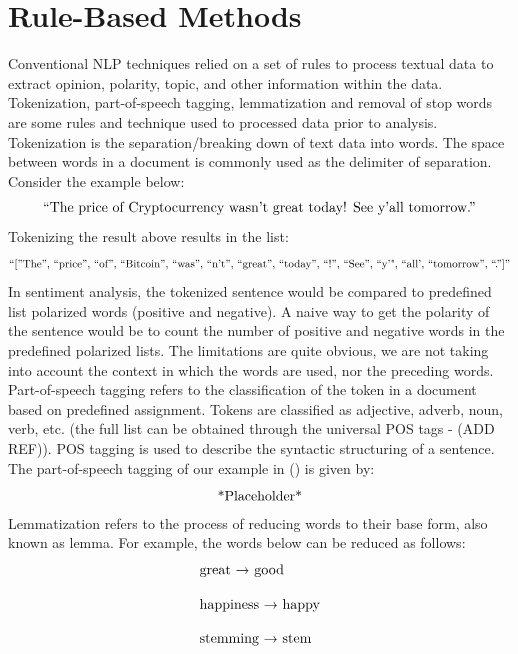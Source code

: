 \par 

\section{Rule-Based Methods}
Conventional NLP techniques relied on a set of rules to process textual data to extract opinion, polarity, topic, and other information within the data. Tokenization, part-of-speech tagging, lemmatization and removal of stop words are some rules and technique used to processed data prior to analysis. Tokenization is the separation/breaking down of text data into words. The space between words in a document is commonly used as the delimiter of separation. Consider the example below:
\begin{align*}
\intertext{“The price of Cryptocurrency wasn’t great today! See y’all tomorrow.”}    
\end{align*}
Tokenizing the result above results in the list:
\begin{align*}
    \intertext{“[”The”, “price”, “of”, “Bitcoin”, “was”,  “n’t”, “great”, “today”, “!”, “See”,  “y’", “all', “tomorrow”, “.”]”}    
\end{align*}
In sentiment analysis, the tokenized sentence would be compared to predefined list polarized words (positive and negative). A naive way to get the polarity of the sentence would be to count the number of positive and negative words in the predefined polarized lists. The limitations are quite obvious, we are not taking into account the context in which the words are used, nor the preceding words. Part-of-speech tagging refers to the classification of the token in a document based on predefined assignment. Tokens are classified as adjective,  adverb, noun, verb, etc. (the full list can be obtained through the universal POS tags - (ADD REF)). POS tagging is used to describe the syntactic structuring of a sentence. The part-of-speech tagging of our example in () is given by:
\begin{align*}
\intertext{*Placeholder*}   
\end{align*}
Lemmatization refers to the process of reducing words  to their base form, also known as lemma. For example, the words below can be reduced as follows:
\begin{align*}
\begin{matrix*}
    \intertext{great → good} \\
    \intertext{happiness → happy} \\
    \intertext{stemming → stem}
\end{matrix*}
\end{align*}
